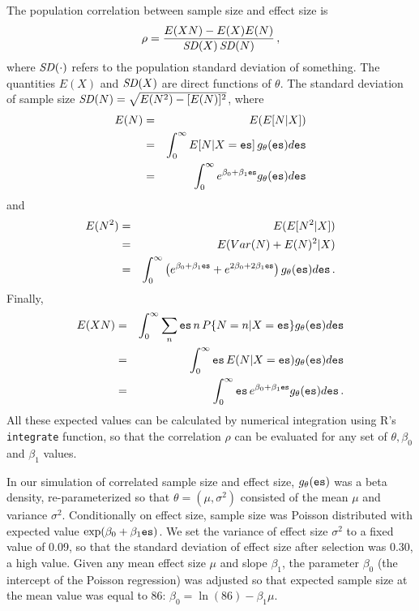 \documentclass[jou]{apa6} %
\newcommand{\R}[1]{\mbox{\texttt{#1}}} %
\begin{document}
The population correlation between sample size and effect size is
\begin{equation*}
    \rho = \frac{E(XN)-E(X)E(N)}{\mbox{\emph{SD}}(X) \, \mbox{\emph{SD}}(N)} \, ,
\end{equation*}
where $\mbox{\emph{SD}}(\cdot)$ refers to the population standard deviation of something.
The quantities $E(X)$ and $\mbox{\emph{SD}}(X)$ are direct functions of $\theta$. The standard deviation of sample size $\mbox{\emph{SD}}(N) = \sqrt{E(N^2)-[E(N)]^2}$, where 
\begin{eqnarray*}
    E(N) & = & E(E[N|X]) \\
    & = & \int_0^\infty E[N|X=\R{es}] \,  g_\theta(\R{es}) d\R{es} \\
    & = & \int_0^\infty e^{\beta_0+\beta_1\scriptsize{\R{es}}} g_\theta(\R{es}) d\R{es}
\end{eqnarray*}
and 
\begin{eqnarray*}
    E(N^2) & = & E(E[N^2|X]) \\
    & = & E(Var(N)+E(N)^2|X) \\
    & = & \int_0^\infty \left( e^{\beta_0+\beta_1\scriptsize{\R{es}}} 
          + e^{2\beta_0+2\beta_1\scriptsize{\R{es}}}
          \right) g_\theta(\R{es}) d\R{es} \, .
\end{eqnarray*}
Finally, 
\begin{eqnarray*}
    E(XN) & = & \int_0^\infty \sum_n \R{es} \, n \,
             P\{N=n|X=\R{es}\} g_\theta(\R{es}) d\R{es} \\
          & = & \int_0^\infty \R{es} \, E(N|X=\R{es}) g_\theta(\R{es}) d\R{es} \\
          & = & \int_0^\infty \R{es} \, e^{\beta_0+\beta_1\scriptsize{\R{es}}} g_\theta(\R{es}) d\R{es} \, .
\end{eqnarray*}
All these expected values can be calculated by numerical integration using R's \texttt{integrate} function, so that the correlation $\rho$ can be evaluated for any set of $\theta, \beta_0$ and $\beta_1$ values. 

In our simulation of correlated sample size and effect size, $g_\theta(\R{es})$ was a beta density, re-parameterized so that $\theta = (\mu,\sigma^2)$ consisted of the mean $\mu$  and variance $\sigma^2$. Conditionally on effect size, sample size was Poisson distributed with expected value $\exp(\beta_0+\beta_1\R{es})$.
We set the variance of effect size $\sigma^2$ to a fixed value of 0.09, so that the standard deviation of effect size after selection was 0.30, a high value. Given any mean effect size $\mu$  and slope $\beta_1$, the parameter $\beta_0$ (the intercept of the Poisson regression) was adjusted so that expected sample size at the mean value was equal to 86: $\beta_0 = \ln(86) - \beta_1\mu$.
\end{document}
